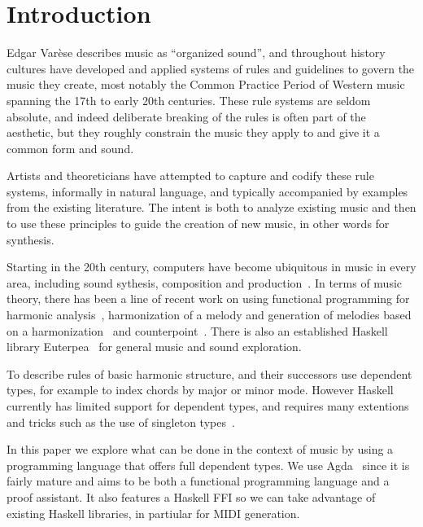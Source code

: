 \section{Introduction}
\label{sec:intro}

Edgar Var\`{e}se describes music as ``organized sound'', and
throughout history cultures have developed and applied systems of rules
and guidelines to govern the music they create, most notably the
Common Practice Period of Western music spanning the 17th to early
20th centuries. These rule systems are seldom absolute, and indeed
deliberate breaking of the rules is often part of the aesthetic, but they
roughly constrain the music they apply to and
give it a common form and sound.

Artists and theoreticians have attempted to capture and codify these
rule systems, informally in natural language, and typically
accompanied by examples from the existing literature. The intent is
both to analyze existing music and then to use these principles to
guide the creation of new music, in other words for synthesis.

Starting in the 20th century, computers have become ubiquitous in
music in every area, including sound sythesis, composition and
production~\citep{roads-tutorial}. In terms of music theory, there has
been a line of recent work on using functional programming for
harmonic
analysis~\citep{magalhaes-harmtrace,dehaas-harmtrace-a,dehaas-harmtrace-b},
harmonization of a melody and generation of melodies based on a
harmonization~\citep{koops-fharm,magalhaes-fcomp} and
counterpoint~\citep{szamozvancev-welltyped}. There is also an
established Haskell library Euterpea~\citep{hudak-haskell} for general music
and sound exploration.

To describe rules of basic harmonic structure,
\citet{magalhaes-harmtrace} and their successors use dependent types,
for example to index chords by major or minor mode.  However Haskell
currently has limited support for dependent types, and requires many
extentions and tricks such as the use of singleton
types~\citep{eisenberg-singleton}.

In this paper we explore what can be done in the context of music by
using a programming language that offers full dependent types. We use
Agda~\citep{norell-phd} since it is fairly mature and
aims to be both a functional programming language and a proof
assistant. It also features a Haskell FFI so we can take advantage of
existing Haskell libraries, in partiular for MIDI generation.

